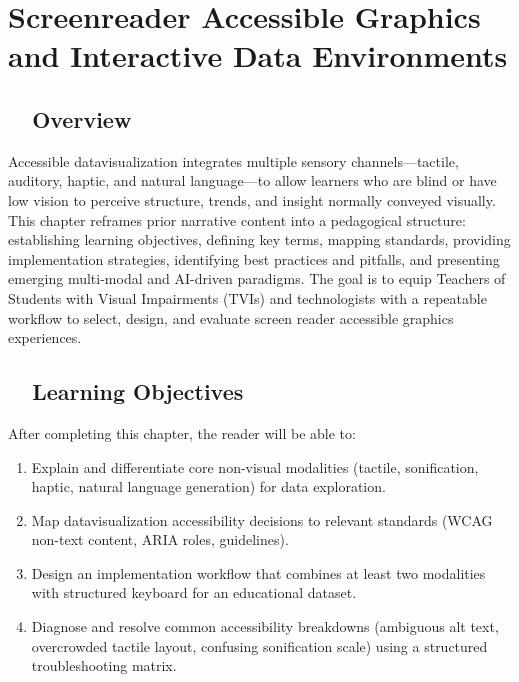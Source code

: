 \chapter{Screenreader Accessible Graphics and Interactive Data Environments}\label{ch13:accessible-graphics}
\raggedright
{}

\section{~~Overview}\label{ch13:sec:overview}
Accessible \gls{datavisualization} integrates multiple sensory channels—tactile, auditory, haptic, and natural language—to allow learners who are blind or have low vision to perceive structure, trends, and insight normally conveyed visually. This chapter reframes prior narrative content into a pedagogical structure: establishing learning objectives, defining key terms, mapping standards, providing implementation strategies, identifying best practices and pitfalls, and presenting emerging multi-modal and AI-driven paradigms. The goal is to equip Teachers of Students with Visual Impairments (TVIs) and  technologists with a repeatable workflow to select, design, and evaluate screen reader accessible graphics experiences.

\section{~~Learning Objectives}\label{ch13:sec:learning-objectives}
After completing this chapter, the reader will be able to:
\begin{enumerate}
	\item Explain and differentiate core non-visual modalities (tactile, sonification, haptic, natural language generation) for data exploration.
	\item Map \gls{datavisualization} accessibility decisions to relevant standards (WCAG non-text content, ARIA roles,  guidelines).
	\item Design an implementation workflow that combines at least two modalities with structured keyboard  for an educational dataset.
	\item Diagnose and resolve common accessibility breakdowns (ambiguous alt text, overcrowded tactile layout, confusing sonification scale) using a structured troubleshooting matrix.
\end{enumerate}

